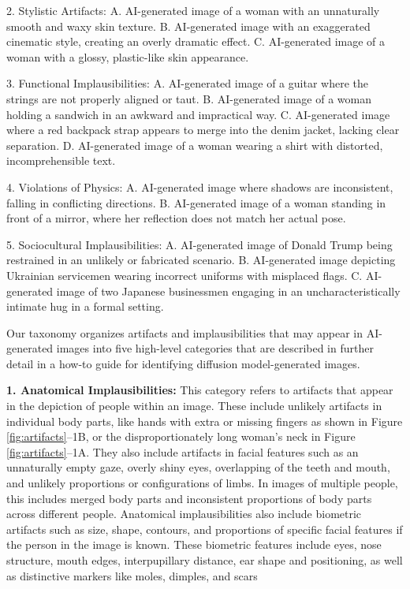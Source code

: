 \begin{figure*}[h!]
{2. Stylistic Artifacts:  
   A. AI-generated image of a woman with an unnaturally smooth and waxy skin texture.  
   B. AI-generated image with an exaggerated cinematic style, creating an overly dramatic effect.  
   C. AI-generated image of a woman with a glossy, plastic-like skin appearance.  

3. Functional Implausibilities:  
   A. AI-generated image of a guitar where the strings are not properly aligned or taut.  
   B. AI-generated image of a woman holding a sandwich in an awkward and impractical way.  
   C. AI-generated image where a red backpack strap appears to merge into the denim jacket, lacking clear separation.  
   D. AI-generated image of a woman wearing a shirt with distorted, incomprehensible text.  

4. Violations of Physics:  
   A. AI-generated image where shadows are inconsistent, falling in conflicting directions.  
   B. AI-generated image of a woman standing in front of a mirror, where her reflection does not match her actual pose.  

5. Sociocultural Implausibilities:  
   A. AI-generated image of Donald Trump being restrained in an unlikely or fabricated scenario.  
   B. AI-generated image depicting Ukrainian servicemen wearing incorrect uniforms with misplaced flags.  
   C. AI-generated image of two Japanese businessmen engaging in an uncharacteristically intimate hug in a formal setting.}
\end{figure*}

Our taxonomy organizes artifacts and implausibilities that may appear in AI-generated images into five high-level categories that are described in further detail in a how-to guide for identifying diffusion model-generated images\cite{kamali2024distinguish}. 

\textbf{1. Anatomical Implausibilities:} This category refers to artifacts that appear in the depiction of people within an image. These include unlikely artifacts in individual body parts, like hands with extra or missing fingers as shown in Figure \ref{fig:artifacts}--1B, or the disproportionately long woman's neck in Figure \ref{fig:artifacts}--1A. They also include artifacts in facial features such as an unnaturally empty gaze, overly shiny eyes, overlapping of the teeth and mouth, and unlikely proportions or configurations of limbs. In images of multiple people, this includes merged body parts and inconsistent proportions of body parts across different people. Anatomical implausibilities also include biometric artifacts such as size, shape, contours, and proportions of specific facial features if the person in the image is known. These biometric features include eyes, nose structure, mouth edges, interpupillary distance, ear shape and positioning, as well as distinctive markers like moles, dimples, and scars~\cite{Lakshmiprabha2011}



